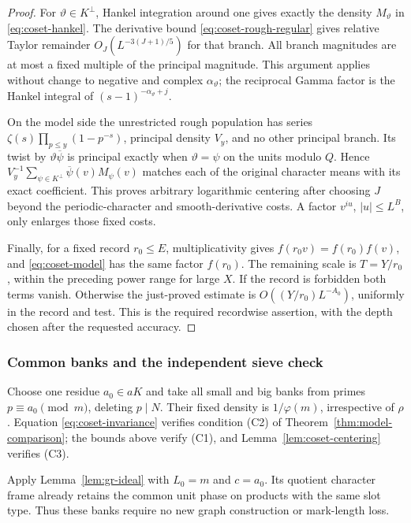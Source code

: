 \begin{proof}
For \(\vartheta\in K^\perp\), Hankel integration around one gives
exactly the density \(M_\vartheta\) in \eqref{eq:coset-hankel}.
The derivative bound \eqref{eq:coset-rough-regular} gives relative
Taylor remainder \(O_J(L^{-3(J+1)/5})\) for that branch. All branch
magnitudes are at most a fixed multiple of the principal magnitude.
This argument applies without change to negative and complex
\(\alpha_\vartheta\); the reciprocal Gamma factor is the Hankel
integral of \((s-1)^{-\alpha_\vartheta+j}\).

On the model side the unrestricted rough population has series
\(\zeta(s)\prod_{p\le y}(1-p^{-s})\), principal density \(V_y\),
and no other principal branch. Its twist by
\(\vartheta\overline\psi\) is principal exactly when
\(\vartheta=\psi\) on the units modulo \(Q\). Hence
\(V_y^{-1}\sum_{\psi\in K^\perp}\overline\psi(v)M_\psi(v)\)
matches each of the original character means with its exact
coefficient. This proves arbitrary logarithmic centering after
choosing \(J\) beyond the periodic-character and smooth-derivative
costs. A factor \(v^{iu}\), \(|u|\le L^B\), only enlarges those
fixed costs.

Finally, for a fixed record \(r_0\le E\), multiplicativity gives
\(f(r_0v)=f(r_0)f(v)\), and \eqref{eq:coset-model} has the same
factor \(f(r_0)\). The remaining scale is \(T=Y/r_0\), within
the preceding power range for large \(X\). If the record is
forbidden both terms vanish. Otherwise the just-proved estimate
is \(O((Y/r_0)L^{-A_0})\), uniformly in the record and test.
This is the required recordwise assertion, with the depth chosen
after the requested accuracy.
\end{proof}

\subsubsection{Common banks and the independent sieve check}

Choose one residue \(a_0\in aK\) and take all small and big banks
from primes \(p\equiv a_0\pmod m\), deleting \(p\mid N\).
Their fixed density is \(1/\varphi(m)\), irrespective of \(\rho\).
Equation \eqref{eq:coset-invariance} verifies condition (C2) of
Theorem~\ref{thm:model-comparison}; the bounds above verify (C1),
and Lemma~\ref{lem:coset-centering} verifies (C3).

Apply Lemma~\ref{lem:gr-ideal} with \(L_0=m\) and \(c=a_0\).
Its quotient character frame already retains the common unit phase
on products with the same slot type. Thus these banks require no
new graph construction or mark-length loss.

